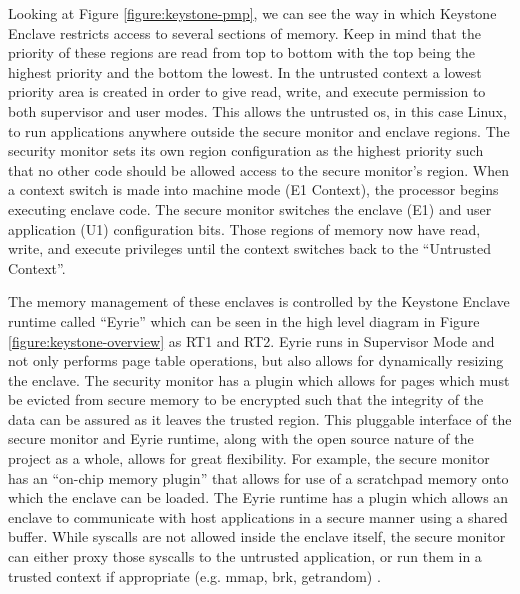 Looking at Figure \ref{figure:keystone-pmp}, we can see the way in which Keystone Enclave restricts access to several sections of memory. Keep in mind that the priority of these regions are read from top to bottom with the top being the highest priority and the bottom the lowest. In the untrusted context a lowest priority area is created in order to give read, write, and execute permission to both supervisor and user modes. This allows the untrusted os, in this case Linux, to run applications anywhere outside the secure monitor and enclave regions. The security monitor sets its own region configuration as the highest priority such that no other code should be allowed access to the secure monitor's region. When a context switch is made into machine mode (E1 Context), the processor begins executing enclave code. The secure monitor switches the enclave (E1) and user application (U1) configuration bits. Those regions of memory now have read, write, and execute privileges until the context switches back to the ``Untrusted Context''. 

The memory management of these enclaves is controlled by the Keystone Enclave runtime called ``Eyrie'' which can be seen in the high level diagram in Figure \ref{figure:keystone-overview} as RT1 and RT2. Eyrie runs in Supervisor Mode and not only performs page table operations, but also allows for dynamically resizing the enclave. The security monitor has a plugin which allows for pages which must be evicted from secure memory to be encrypted such that the integrity of the data can be assured as it leaves the trusted region. This pluggable interface of the secure monitor and Eyrie runtime, along with the open source nature of the project as a whole, allows for great flexibility. For example, the secure monitor has an ``on-chip memory plugin'' \cite{lee2019keystone} that allows for use of a scratchpad memory onto which the enclave can be loaded. The Eyrie runtime has a plugin which allows an enclave to communicate with host applications in a secure manner using a shared buffer. While syscalls are not allowed inside the enclave itself, the secure monitor can either proxy those syscalls to the untrusted application, or run them in a trusted context if appropriate (e.g. mmap, brk, getrandom) \cite{lee2019keystone}.

